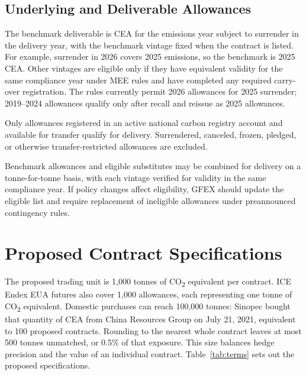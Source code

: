 \documentclass[10pt,a4paper,twocolumn]{article}
\begin{document}
\subsection{Underlying and Deliverable Allowances}
The benchmark deliverable is CEA for the emissions year subject to surrender in the delivery year, with the benchmark vintage fixed when the contract is listed. For example, surrender in 2026 covers 2025 emissions, so the benchmark is 2025 CEA\cite{mee2026work}. Other vintages are eligible only if they have equivalent validity for the same compliance year under MEE rules and have completed any required carry-over registration. The rules currently permit 2026 allowances for 2025 surrender\cite{mee2026allocation}; 2019--2024 allowances qualify only after recall and reissue as 2025 allowances\cite{mee2024carryover,mee2026allocation}.

Only allowances registered in an active national carbon registry account and available for transfer qualify for delivery\cite{mee2021reg}. Surrendered, canceled, frozen, pledged, or otherwise transfer-restricted allowances are excluded.

Benchmark allowances and eligible substitutes may be combined for delivery on a tonne-for-tonne basis, with each vintage verified for validity in the same compliance year. If policy changes affect eligibility, GFEX should update the eligible list and require replacement of ineligible allowances under preannounced contingency rules.

\section{Proposed Contract Specifications}
The proposed trading unit is 1,000 tonnes of CO\textsubscript{2} equivalent per contract. ICE Endex EUA futures also cover 1,000 allowances, each representing one tonne of CO\textsubscript{2} equivalent\cite{iceEuaSpecs}. Domestic purchases can reach 100,000 tonnes: Sinopec bought that quantity of CEA from China Resources Group on July 21, 2021\cite{sinopec2021bulk}, equivalent to 100 proposed contracts. Rounding to the nearest whole contract leaves at most 500 tonnes unmatched, or 0.5\% of that exposure. This size balances hedge precision and the value of an individual contract. Table~\ref{tab:terms} sets out the proposed specifications.
\end{document}
